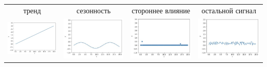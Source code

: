 \documentclass[fullscreen=true, bookmarks=true, hyperref={pdfencoding=unicode}]{beamer}
\begin{document}
\begin{frame}
  \begin{tabular}{cccc}
    тренд \hfill & сезонность & стороннее влияние & остальной сигнал \\
    \hspace{-1.2cm}\includegraphics[keepaspectratio,
                   width=.2\paperwidth]{trend.jpg}
    &
    \includegraphics[keepaspectratio,
                   width=.2\paperwidth]{season.jpg}
    &
    \includegraphics[keepaspectratio,
                   width=.2\paperwidth]{site_impact.jpg}
    &
    \includegraphics[keepaspectratio,
                   width=.2\paperwidth]{other_signal.jpg}
  \end{tabular}
\end{frame}
\end{document}
